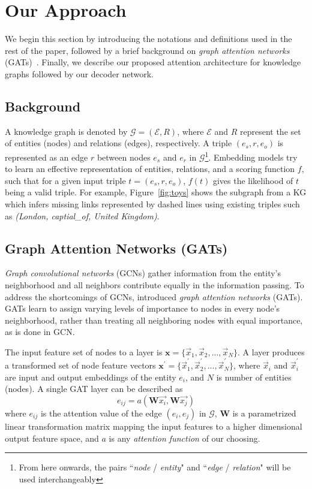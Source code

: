 \documentclass[11pt,a4paper]{article}
\begin{document}
\section{Our Approach}\label{our_approach}
We begin this section by introducing the notations and definitions used in the rest of the paper, 
followed by a brief background on \emph{graph attention networks} (GATs)~\cite{velickovic2018graph}. Finally, we describe our proposed attention architecture for knowledge graphs followed by our decoder network. 

\subsection{Background}
\label{ssec:background}
A knowledge graph is denoted by $\mathcal{G}=(\mathcal{E}, R)$, where $\mathcal{E}$ and $R$ represent the set of entities (nodes) and relations (edges), respectively. A triple \((e_s, r, e_o)\) is represented as an edge $r$ between nodes $e_s$ and $e_r$ in $\mathcal{G}$\footnote{From here onwards, the pairs ``\emph{node} / \emph{entity}" and ``\emph{edge} / \emph{relation}" will be used interchangeably}.
Embedding models try to learn an effective representation of entities, relations, and a scoring function \(f\), such that for a given input triple \(t = (e_s, r, e_o)\), \(f(t)\) gives the likelihood of \(t\) being a valid triple. For example, 
Figure~\ref{fig:toys} shows the subgraph from a KG which infers missing links represented by dashed lines using existing triples such as \textit{(London, captial\_of, United Kingdom)}.

\subsection{Graph Attention Networks (GATs)}
\label{ssec:background}
\emph{Graph convolutional networks} (GCNs) \cite{kipf2017semi} gather information from the entity's neighborhood and all  neighbors contribute equally in the information passing.
To address the shortcomings of GCNs, \cite{velickovic2018graph} introduced \emph{graph attention networks} (GATs). GATs learn to assign varying levels of importance to nodes in every node's neighborhood, rather than treating all neighboring nodes with equal importance, as is done in GCN. 

The input feature set of nodes to a layer is \(\textbf{x} = \{\vec{x}_{1},\vec{x}_{2},...,\vec{x}_{N}\}\). A layer produces a transformed set of node feature vectors \(\textbf{x}^\prime = \{\vec{x}_{1}^{\prime},\vec{x}_{2}^{\prime},...,\vec{x}_{N}^{\prime}\}\), where \(\vec{x}_{i}\) and \(\vec{x}_{i}^{\prime}\) are input and output embeddings of the entity \(e_i\), and \(N\) is number of entities (nodes). A single GAT layer can be described as
\begin{equation}\label{eq:eij}
 e_{ij} = a(\textbf{W} \vec{x_{i}},\textbf{W} \vec{x_{j}})
\end{equation}
where \(e_{ij}\) is the attention value of the edge \((e_i, e_j)\) in $\mathcal{G}$, \(\textbf{W}\) is a parametrized linear transformation matrix mapping the input features to a higher dimensional output feature space, and \(a\) is any \emph{attention function} of our choosing.
\end{document}
